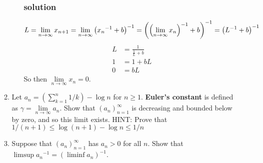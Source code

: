 \documentclass[letterpaper]{article}
\begin{document}
\begin{enumerate}
\begin{enumerate}
\begin{enumerate}
    \subsubsection*{solution}
    \[
    L=\lim_{n\to\infty}x_{n+1}=\lim_{n\to\infty}\left({x_n}^{-1}+b\right)^{-1}=\left(\left({\lim_{n\to\infty}x_n}\right)^{-1}+b\right)^{-1}=\left(L^{-1}+b\right)^{-1}\\
    \]
    \begin{align*}
      L&=\frac{1}{\frac{1}{L}+b}\\
      1&=1+bL\\
      0&=bL
    \end{align*}
    So then $\lim\limits_{n\to\infty}{x_n}=0$.
    \end{enumerate}
  \item
  Let $a_n=(\sum_{k=1}^n{1/k})-\log n$ for $n\ge 1$. {\bfseries Euler's constant} is defined as $\gamma=\lim\limits_{n\to\infty}a_n$. Show that $(a_n)_{n=1}^\infty$ is decreasing and bounded below by zero, and so this limit exists. \uppercase{Hint}: Prove that $1/(n+1)\le\log(n+1)-\log n\le1/n$
  \setcounter{enumii}{12}
  \item
  Suppose that $(a_n)_{n=1}^\infty$ has $a_n>0$ for all $n$. Show that $\limsup {a_n}^{-1}=(\liminf a_n)^{-1}$.
  \end{enumerate}
\end{enumerate}
\end{document}
